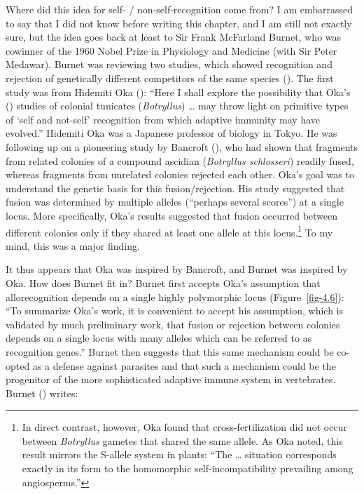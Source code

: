 \documentclass[
  letterpaper,
]{book}
\begin{document}
Where did this idea for self- / non-self-recognition come from? I am
embarrassed to say that I did not know before writing this chapter, and
I am still not exactly sure, but the idea goes back at least to Sir
Frank McFarland Burnet, who was cowinner of the 1960 Nobel Prize in
Physiology and Medicine (with Sir Peter Medawar). Burnet was reviewing
two studies, which showed recognition and rejection of genetically
different competitors of the same species
(). The first study was from
Hidemiti Oka (): ``Here I shall explore the
possibility that Oka's () studies of
colonial tunicates (\emph{Botryllus}) \ldots{} may throw light on
primitive types of `self and not-self' recognition from which adaptive
immunity may have evolved.'' Hidemiti Oka was a Japanese professor of
biology in Tokyo. He was following up on a pioneering study by Bancroft
(), who had shown that fragments from
related colonies of a compound ascidian (\emph{Botryllus schlosseri})
readily fused, whereas fragments from unrelated colonies rejected each
other. Oka's goal was to understand the genetic basis for this
fusion/rejection. His study suggested that fusion was determined by
multiple alleles (``perhaps several scores'') at a single locus. More
specifically, Oka's results suggested that fusion occurred between
different colonies only if they shared at least one allele at this
locus.\footnote{In direct contrast, however, Oka found that
  cross-fertilization did not occur between \emph{Botryllus} gametes
  that shared the same allele. As Oka noted, this result mirrors the
  S-allele system in plants: ``The \ldots{} situation corresponds
  exactly in its form to the homomorphic self-incompatibility prevailing
  among angiosperms.''} To my mind, this was a major finding.

It thus appears that Oka was inspired by Bancroft, and Burnet was
inspired by Oka. How does Burnet fit in? Burnet first accepts Oka's
assumption that allorecognition depends on a single highly polymorphic
locus (Figure~\ref{fig-4.6}): ``To summarize Oka's work, it is
convenient to accept his assumption, which is validated by much
preliminary work, that fusion or rejection between colonies depends on a
single locus with many alleles which can be referred to as recognition
genes.'' Burnet then suggests that this same mechanism could be co-opted
as a defense against parasites and that such a mechanism could be the
progenitor of the more sophisticated adaptive immune system in
vertebrates. Burnet () writes:
\end{document}
